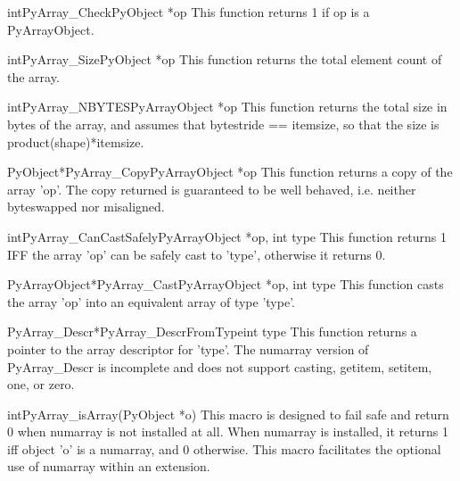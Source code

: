 \begin{cfuncdesc}{int}{PyArray_Check}{PyObject *op}
   This function returns 1 if op is a PyArrayObject.  
\end{cfuncdesc}

\begin{cfuncdesc}{int}{PyArray_Size}{PyObject *op}
   This function returns the total element count of the array.
\end{cfuncdesc}

\begin{cfuncdesc}{int}{PyArray_NBYTES}{PyArrayObject *op}
   This function returns the total size in bytes of the array, and assumes that
bytestride == itemsize, so that the size is product(shape)*itemsize.
\end{cfuncdesc}

\begin{cfuncdesc}{PyObject*}{PyArray_Copy}{PyArrayObject *op}
   This function returns a copy of the array 'op'.  The copy returned is
   guaranteed to be well behaved, i.e. neither byteswapped nor misaligned.
\end{cfuncdesc}

\begin{cfuncdesc}{int}{PyArray_CanCastSafely}{PyArrayObject *op, int type}
  This function returns 1 IFF the array 'op' can be safely cast to 'type',
otherwise it returns 0.
\end{cfuncdesc}

\begin{cfuncdesc}{PyArrayObject*}{PyArray_Cast}{PyArrayObject *op, int type}
  This function casts the array 'op' into an equivalent array of type 'type'.
\end{cfuncdesc}

\begin{cfuncdesc}{PyArray_Descr*}{PyArray_DescrFromType}{int type}
This function returns a pointer to the array descriptor for 'type'.  The
numarray version of PyArray_Descr is incomplete and does not support casting,
getitem, setitem, one, or zero.
\end{cfuncdesc}

\begin{cfuncdesc}{int}{PyArray_isArray(PyObject *o)}
  This macro is designed to fail safe and return 0 when numarray is not
  installed at all.  When numarray is installed, it returns 1 iff object 'o' is
  a numarray, and 0 otherwise.  This macro facilitates the optional use of
  numarray within an extension.
\end{cfuncdesc}

